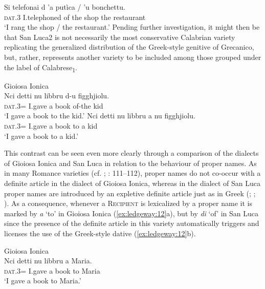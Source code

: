 \documentclass[output=paper,modfonts,nonflat,colorlinks,citecolor=brown]{langsci/langscibook}
\begin{document}
{    \ex
    \gll Si  telefonai  d  ’a  putìca /  ’u  bonchettu.\\
    \textsc{dat}.3  I.telephoned  of  the  shop  the  restaurant\\
    \glt `I rang the shop / the restaurant.'
    \z
    \z
    Pending further investigation, it might then be that San Luca2 is not necessarily the most conservative Calabrian variety replicating the generalized distribution of the Greek-style genitive of Grecanico, but, rather, represents another variety to be included among those grouped under the label of Calabrese\textsubscript{1}.
}

\ea\label{ex:ledgeway:11}
  Gioiosa Ionica\\
\ea
	\gll Nci  detti  nu  libbru  d-u  figghjiolu.\\
        \textsc{dat}.3=  I.gave   a  book  of-the   kid  \\
        \glt `I gave a book to the kid.'
\ex
	\gll Nci  detti  nu  libbru  a  nu  figghjiolu.\\
        \textsc{dat}.3=  I.gave   a  book  to  a   kid  \\
        \glt `I gave a book to a kid.'
        \z
        \z

This contrast can be seen even more clearly through a comparison of the dialects of Gioiosa Ionica and San Luca in relation to the behaviour of proper names. As in many Romance varieties (cf. \citealt[103--104]{Ledgeway2012}; \citeyear{Ledgeway2015}: 111--112), proper names do not co-occur with a definite article in the dialect of Gioiosa Ionica, whereas in the dialect of San Luca proper names are introduced by an expletive definite article just as in Greek (\citealt[198]{Mackridge1985}; \citealt[276--278]{HoltonMackridgePhilippaki-Warburton1997}; \citealt[208--209]{Ledgeway2013}). As a consequence, whenever a \textsc{Recipient} is lexicalized by a proper name it is marked by \textit{a} ‘to’ in Gioiosa Ionica (\ref{ex:ledgeway:12}a), but by \textit{di} ‘of’ in San Luca since the presence of the definite article in this variety automatically triggers and licenses the use of the Greek-style dative (\ref{ex:ledgeway:12}b).

\ea\label{ex:ledgeway:12}

  \ea  Gioiosa Ionica\\
 \gll Nci      detti   nu   libbru    a   Maria.\\
               \textsc{dat}.3=  I.gave  a  book  to   Maria\\
               \glt `I gave a book to Maria.'
               
\end{document}
